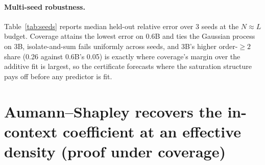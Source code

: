 \paragraph{Multi-seed robustness.} Table~\ref{tab:seeds} reports median held-out relative error over 3
seeds at the $N\approx L$ budget. Coverage attains the lowest error on 0.6B and ties the
Gaussian process on 3B, isolate-and-sum fails uniformly across seeds, and 3B's higher order-$\ge 2$
share (0.26 against 0.6B's 0.05) is exactly where coverage's margin over the additive fit is largest,
so the certificate forecasts where the saturation structure pays off before any predictor is fit.

\begin{table}[t]
\centering\small
\caption{Multi-seed robustness at the $N\approx L$ budget, with the certificate per row.}
\label{tab:seeds}
\end{table}

\section{Aumann--Shapley recovers the in-context coefficient at an effective density (proof under
coverage)}\label{app:as}

